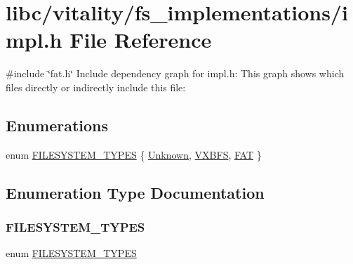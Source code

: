 \hypertarget{a00155}{}\section{libc/vitality/fs\+\_\+implementations/impl.h File Reference}
\label{a00155}
{\ttfamily \#include \char`\"{}fat.\+h\char`\"{}}\newline
Include dependency graph for impl.\+h\+:
This graph shows which files directly or indirectly include this file\+:
\subsection*{Enumerations}
\begin{DoxyCompactItemize}
\item 
enum \hyperlink{a00155_a2e9d0c3765a28910638672bfc746181b_a2e9d0c3765a28910638672bfc746181b}{F\+I\+L\+E\+S\+Y\+S\+T\+E\+M\+\_\+\+T\+Y\+P\+ES} \{ \hyperlink{a00155_a2e9d0c3765a28910638672bfc746181b_a2e9d0c3765a28910638672bfc746181ba4e81c184ac3ad48a389cd4454c4a05bb}{Unknown}, 
\hyperlink{a00155_a2e9d0c3765a28910638672bfc746181b_a2e9d0c3765a28910638672bfc746181bac740d3121d634c0d77f5602b1fdab236}{V\+X\+B\+FS}, 
\hyperlink{a00155_a2e9d0c3765a28910638672bfc746181b_a2e9d0c3765a28910638672bfc746181ba5bb1a436c641e5391d9474ed95f4f56a}{F\+AT}
 \}
\end{DoxyCompactItemize}


\subsection{Enumeration Type Documentation}
\mbox{\label{a00155_a2e9d0c3765a28910638672bfc746181b_a2e9d0c3765a28910638672bfc746181b}} 
\subsubsection{\texorpdfstring{F\+I\+L\+E\+S\+Y\+S\+T\+E\+M\+\_\+\+T\+Y\+P\+ES}{FILESYSTEM\_TYPES}}
{\footnotesize\ttfamily enum \hyperlink{a00155_a2e9d0c3765a28910638672bfc746181b_a2e9d0c3765a28910638672bfc746181b}{F\+I\+L\+E\+S\+Y\+S\+T\+E\+M\+\_\+\+T\+Y\+P\+ES}}


